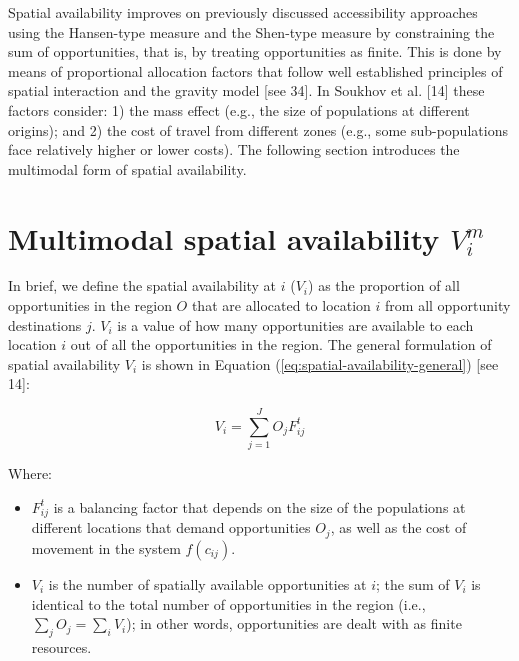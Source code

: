 \documentclass[10pt,letterpaper]{article}
\begin{document}
Spatial availability improves on previously discussed accessibility
approaches using the Hansen-type measure and the Shen-type measure by
constraining the sum of opportunities, that is, by treating
opportunities as finite. This is done by means of proportional
allocation factors that follow well established principles of spatial
interaction and the gravity model {[}see 34{]}. In Soukhov et al.
{[}14{]} these factors consider: 1) the mass effect (e.g., the size of
populations at different origins); and 2) the cost of travel from
different zones (e.g., some sub-populations face relatively higher or
lower costs). The following section introduces the multimodal form of
spatial availability.

\hypertarget{multimodal-spatial-availability-v_im}{%
\section{\texorpdfstring{Multimodal spatial availability
\(V_i^m\)}{Multimodal spatial availability V\_i\^{}m}}\label{multimodal-spatial-availability-v_im}}

In brief, we define the spatial availability at \(i\) (\(V_{i}\)) as the
proportion of all opportunities in the region \(O\) that are allocated
to location \(i\) from all opportunity destinations \(j\). \(V_{i}\) is
a value of how many opportunities are available to each location \(i\)
out of all the opportunities in the region. The general formulation of
spatial availability \(V_{i}\) is shown in Equation
(\ref{eq:spatial-availability-general}) {[}see 14{]}:

\begin{equation}
\label{eq:spatial-availability-general}
V_i = \sum_{j=1}^J O_jF^t_{ij}
\end{equation}

\noindent Where:

\begin{itemize}
\item
  \(F^t_{ij}\) is a balancing factor that depends on the size of the
  populations at different locations that demand opportunities \(O_j\),
  as well as the cost of movement in the system \(f(c_{ij})\).
\item
  \(V_i\) is the number of spatially available opportunities at \(i\);
  the sum of \(V_{i}\) is identical to the total number of opportunities
  in the region (i.e., \(\sum_j O_j = \sum_i V_i\)); in other words,
  opportunities are dealt with as finite resources.
\end{itemize}
\end{document}
